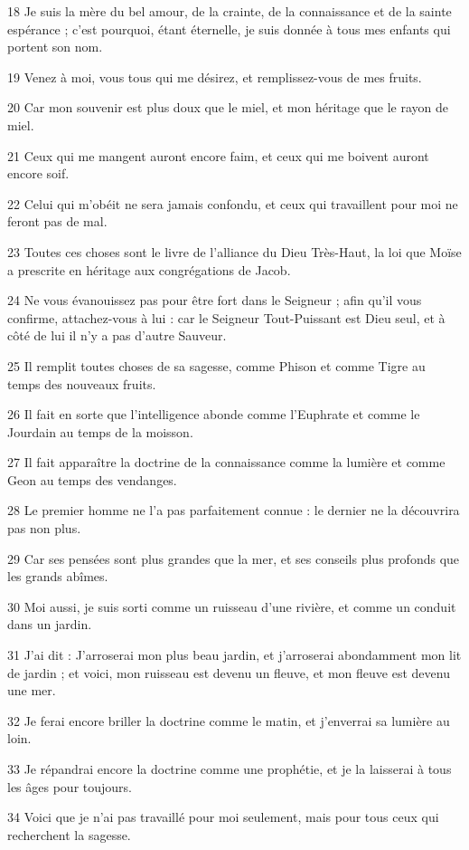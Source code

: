 \par 18 Je suis la mère du bel amour, de la crainte, de la connaissance et de la sainte espérance ; c'est pourquoi, étant éternelle, je suis donnée à tous mes enfants qui portent son nom.
\par 19 Venez à moi, vous tous qui me désirez, et remplissez-vous de mes fruits.
\par 20 Car mon souvenir est plus doux que le miel, et mon héritage que le rayon de miel.
\par 21 Ceux qui me mangent auront encore faim, et ceux qui me boivent auront encore soif.
\par 22 Celui qui m'obéit ne sera jamais confondu, et ceux qui travaillent pour moi ne feront pas de mal.
\par 23 Toutes ces choses sont le livre de l'alliance du Dieu Très-Haut, la loi que Moïse a prescrite en héritage aux congrégations de Jacob.
\par 24 Ne vous évanouissez pas pour être fort dans le Seigneur ; afin qu'il vous confirme, attachez-vous à lui : car le Seigneur Tout-Puissant est Dieu seul, et à côté de lui il n'y a pas d'autre Sauveur.
\par 25 Il remplit toutes choses de sa sagesse, comme Phison et comme Tigre au temps des nouveaux fruits.
\par 26 Il fait en sorte que l'intelligence abonde comme l'Euphrate et comme le Jourdain au temps de la moisson.
\par 27 Il fait apparaître la doctrine de la connaissance comme la lumière et comme Geon au temps des vendanges.
\par 28 Le premier homme ne l'a pas parfaitement connue : le dernier ne la découvrira pas non plus.
\par 29 Car ses pensées sont plus grandes que la mer, et ses conseils plus profonds que les grands abîmes.
\par 30 Moi aussi, je suis sorti comme un ruisseau d'une rivière, et comme un conduit dans un jardin.
\par 31 J'ai dit : J'arroserai mon plus beau jardin, et j'arroserai abondamment mon lit de jardin ; et voici, mon ruisseau est devenu un fleuve, et mon fleuve est devenu une mer.
\par 32 Je ferai encore briller la doctrine comme le matin, et j'enverrai sa lumière au loin.
\par 33 Je répandrai encore la doctrine comme une prophétie, et je la laisserai à tous les âges pour toujours.
\par 34 Voici que je n'ai pas travaillé pour moi seulement, mais pour tous ceux qui recherchent la sagesse.

